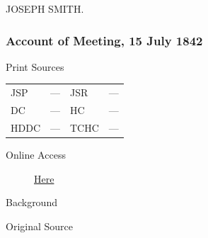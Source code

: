 				\begin{tightright}
					JOSEPH SMITH.
				\end{tightright}
				
		\subsubsection{Account of Meeting, 15 July 1842}
			\label{EMS-1842-JS-15-JUL-1842}
			
			\begin{description}
				\item[Print Sources]
			\end{description}

			\begin{tabular}{p{0.5in}p{1in}p{0.5in}p{1in}}
				JSP	 	& ---		& JSR 		& --- \\
				DC	 	& ---		& HC 		& --- \\
				HDDC 	& ---		& TCHC 		& --- \\
			\end{tabular}
			
			\begin{description}
				\item[Online Access] \href{https://www.josephsmithpapers.org/paper-summary/account-of-meeting-15-july-1842/1}{Here}
			\end{description}
			
			\begin{description}
				\item[Background]
			\end{description}
			
			
			\begin{description}
				\item[Original Source]
			\end{description}
			
			

